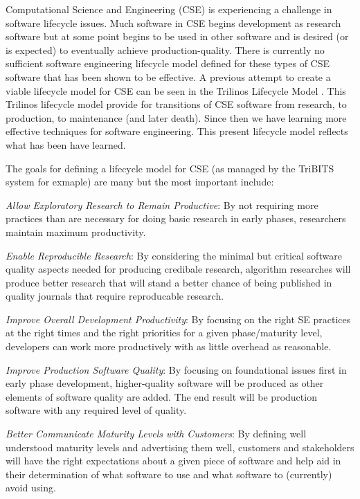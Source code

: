 \documentclass[11pt]{SANDreport}
\begin{document}
Computational Science and Engineering (CSE) is experiencing a
challenge in software lifecycle issues.  Much software in CSE begins
development as research software but at some point begins to be used
in other software and is desired (or is expected) to eventually
achieve production-quality.  There is currently no sufficient software
engineering lifecycle model defined for these types of CSE software
that has been shown to be effective.  A previous attempt to create a
viable lifecycle model for CSE can be seen in the Trilinos Lifecycle
Model {}\cite{TrilinosLifecycleModel2007}.  This Trilinos lifecycle
model provide for transitions of CSE software from research, to
production, to maintenance (and later death).  Since then we have
learning more effective techniques for software engineering.  This
present lifecycle model reflects what has been have learned.

The goals for defining a lifecycle model for CSE (as managed by the
TriBITS system for exmaple) are many but the most important include:

\begin{compactitem}

{}\item\textit{Allow Exploratory Research to Remain Productive}: By
not requiring more practices than are necessary for doing basic
research in early phases, researchers maintain maximum productivity.

{}\item\textit{Enable Reproducible Research}: By considering the
minimal but critical software quality aspects needed for producing
credibale research, algorithm researches will produce better research
that will stand a better chance of being published in quality journals
that require reproducable research.

{}\item\textit{Improve Overall Development Productivity}: By focusing
on the right SE practices at the right times and the right priorities
for a given phase/maturity level, developers can work more
productively with as little overhead as reasonable.

{}\item\textit{Improve Production Software Quality}: By focusing on
foundational issues first in early phase development, higher-quality
software will be produced as other elements of software quality are
added.  The end result will be production software with any required
level of quality.

{}\item\textit{Better Communicate Maturity Levels with Customers}: By
defining well understood maturity levels and advertising them well,
customers and stakeholders will have the right expectations about a
given piece of software and help aid in their determination of what
software to use and what software to (currently) avoid using.

\end{compactitem}
\end{document}
